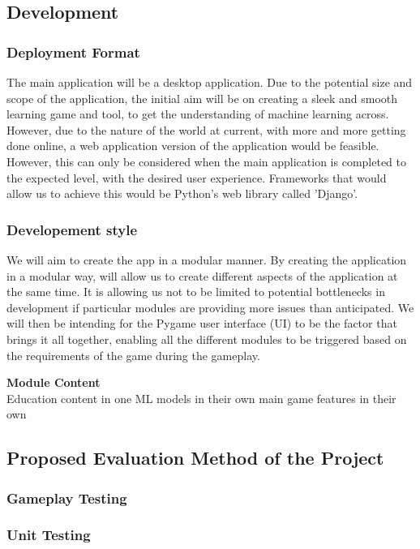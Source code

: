 \documentclass[a4paper,10pt]{article}
\begin{document}
\subsection{Development}
\subsubsection{Deployment Format}
The main application will be a desktop application.  Due to the potential size and scope of the application, the initial aim will be on creating a sleek and smooth learning game and tool, to get the understanding of machine learning across. However, due to the nature of the world at current, with more and more getting done online, a web application version of the application would be feasible. However, this can only be considered when the main application is completed to the expected level, with the desired user experience. Frameworks that would allow us to achieve this would be Python's web library called 'Django'.

\subsubsection{Developement style}
We will aim to create the app in a modular manner. By creating the application in a modular way, will allow us to create different aspects of the application at the same time. It is allowing us not to be limited to potential bottlenecks in development if particular modules are providing more issues than anticipated. We will then be intending for the Pygame user interface (UI) to be the factor that brings it all together, enabling all the different modules to be triggered based on the requirements of the game during the gameplay.

\textbf{Module Content}\\
Education content in one
ML models in their own
main game features in their own

\subsection{Proposed Evaluation Method of the Project}
\subsubsection{Gameplay Testing}

\subsubsection{Unit Testing}
\end{document}
